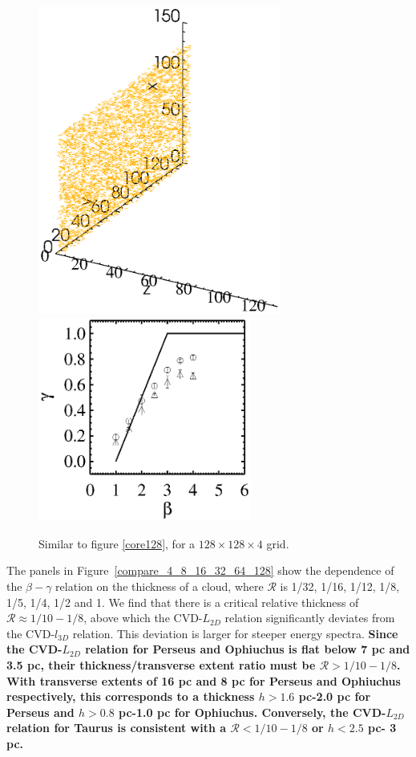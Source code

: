 \documentclass[iop,revtex4]{emulateapj}
\begin{document}
\begin{figure}[htbp]
\includegraphics[width=8cm]{fft_simu_plot_core4.eps} \includegraphics[width=7cm]{beta_gamma4.eps}
\caption{ Similar to figure \ref{core128}, for a $128\times 128\times 4$ grid.
\label{core4}}
\end{figure}




The panels in Figure~\ref{compare_4_8_16_32_64_128} show the dependence of the
$\beta-\gamma$ relation on the thickness of a cloud, where $\mathcal{R}$ is
1/32, 1/16, 1/12, 1/8, 1/5, 1/4, 1/2 and 1. We find that there is a critical
relative thickness of $\mathcal{R}\approx 1/10 - 1/8$, above which the
CVD-$L_{2D}$ relation significantly deviates from the CVD-$l_{3D}$ relation.
This deviation is larger for steeper energy spectra. {\bf Since the
CVD-$L_{2D}$ relation for Perseus and Ophiuchus is flat below
7 pc and 3.5 pc, their thickness/transverse extent ratio must be
$\mathcal{R}> 1/10 - 1/8$. With transverse extents of 16 pc and 8 pc for
Perseus and Ophiuchus respectively, this corresponds to a thickness $h>1.6$ pc-2.0 pc for
Perseus and $h>0.8$ pc-1.0 pc for Ophiuchus. Conversely, the CVD-$L_{2D}$
relation for Taurus is consistent with a $\mathcal{R}<1/10-1/8$ or $h<2.5$ pc-
3 pc.}
\end{document}
